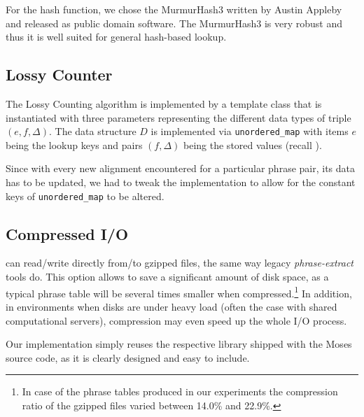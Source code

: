 For the hash function, we chose the MurmurHash3 written by Austin Appleby and released as
public domain software.
The MurmurHash3 is very robust and thus it is well suited for general hash-based lookup.

\subsection{Lossy Counter}

The Lossy Counting algorithm is implemented by a template class that is instantiated with
three parameters representing the different data types of triple $(e, f, \Delta)$.
The data structure $D$ is implemented via \texttt{unordered_map} with items $e$ being
the lookup keys and pairs $(f, \Delta)$ being the stored values (recall ).

Since with every new alignment encountered for a particular phrase pair, its data has to
be updated, we had to tweak the implementation to allow for the constant keys of
\texttt{unordered_map} to be altered.

\subsection{Compressed I/O}

\Eppex{} can read/write directly from/to gzipped files, the same way legacy \emph{phrase-extract}
tools do.
This option allows to save a significant amount of disk space, as a typical phrase table will be
several times smaller when compressed.\footnote{In case of the phrase tables produced in our experiments
the compression ratio of the gzipped files varied between 14.0\% and 22.9\%.}
In addition, in environments when disks are under heavy load (often the case with shared computational servers),
compression may even speed up the whole I/O process.

Our implementation simply reuses the respective library shipped with the Moses source code,
as it is clearly designed and easy to include.

